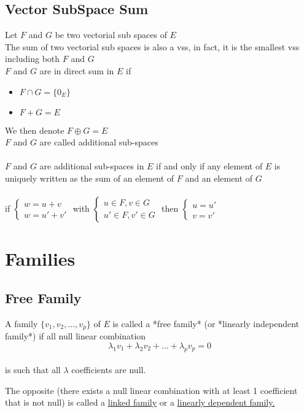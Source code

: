 \documentclass[notitlepage]{math}
\begin{document}
\subsection{Vector SubSpace Sum}
Let $F$ and $G$ be two vectorial sub spaces of $E$\\
The sum of two vectorial sub spaces is also a vss, in fact, it is the smallest vss including both  $F$ and $G$ \\
$F$ and $G$ are in direct sum in $E$ if
\begin{itemize}
    \item $F \cap G = \{0_E\}$
    \item $F + G = E$
\end{itemize}
We then denote $F \oplus G = E$\\
$F$  and $G$ are called additional sub-spaces\\\\
$F$ and $G$ are additional sub-spaces in $E$ if and only if any element of $E$ is uniquely written as the sum of an element of $F$ and an element of $G$ \\ \\
if $\begin{cases}
    w = u + v \\
    w = u' + v'
\end{cases}$
with $\begin{cases}
    u \in F, v \in G \\
    u' \in F, v' \in G
\end{cases}$
then $\begin{cases}
    u = u' \\
    v = v'
\end{cases}$


\section{Families}
\subsection{Free Family}
A family $\{v_1,v_2,...,v_p\}$  of $E$ is called a *free family*  (or *linearly independent family*) if all null linear combination\\
\[\lambda_1v_1 + \lambda_2v_2 + ... + \lambda_pv_p = 0\]\\
is such that all $\lambda$ coefficients are null.

The opposite (there exists a null linear combination with at least 1 coefficient that is not null) is called a \underline{linked family} or a \underline{linearly dependent family.}\\
\end{document}
